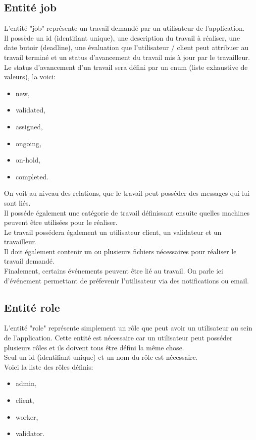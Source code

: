 \documentclass[
    iai, %
    il, %
]{heig-tb}
\begin{document}
\subsection{Entité job}
L'entité "job" représente un travail demandé par un utilisateur de l'application.\\
Il possède un id (identifiant unique), une description du travail à réaliser, une date butoir (deadline), une évaluation que l'utilisateur / client peut attribuer au travail terminé et un status d'avancement du travail mis à jour par le travailleur.\\
Le status d'avancement d'un travail sera défini par un enum (liste exhaustive de valeurs), la voici:
\begin{itemize}
    \item new,
    \item validated,
    \item assigned,
    \item ongoing,
    \item on-hold,
    \item completed.
\end{itemize}

On voit au niveau des relations, que le travail peut posséder des messages qui lui sont liés.\\
Il posséde également une catégorie de travail définissant ensuite quelles machines peuvent être utilisées pour le réaliser.\\
Le travail possédera également un utilisateur client, un validateur et un travailleur.\\
Il doit également contenir un ou plusieurs fichiers nécessaires pour réaliser le travail demandé.\\
Finalement, certains événements peuvent être lié au travail. On parle ici d'événement permettant de préfevenir l'utilisateur via des notifications ou email.

\subsection{Entité role}
L'entité "role" représente simplement un rôle que peut avoir un utilisateur au sein de l'application. Cette entité est nécessaire car un utilisateur peut posséder plusieurs rôles et ils doivent tous être défini la même chose.\\
Seul un id (identifiant unique) et un nom du rôle est nécessaire.\\
Voici la liste des rôles définis:
\begin{itemize}
    \item admin,
    \item client,
    \item worker,
    \item validator.
\end{itemize}
\end{document}
